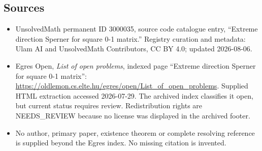 \documentclass[11pt]{article}
\begin{document}
\subsection{Sources}
\begin{itemize}
\item UnsolvedMath permanent ID 3000035, source code catalogue entry, ``Extreme direction Sperner for square 0-1 matrix.'' Registry curation and metadata: Ulam AI and UnsolvedMath Contributors, CC BY 4.0; updated 2026-08-06.
\item Egres Open, \emph{List of open problems}, indexed page ``Extreme direction Sperner for square 0-1 matrix'': \url{https://oldlemon.cs.elte.hu/egres/open/List_of_open_problems}. Supplied HTML extraction accessed 2026-07-29. The archived index classifies it open, but current status requires review. Redistribution rights are NEEDS\_REVIEW because no license was displayed in the archived footer.
\item No author, primary paper, existence theorem or complete resolving reference is supplied beyond the Egres index. No missing citation is invented.
\end{itemize}
\end{document}
